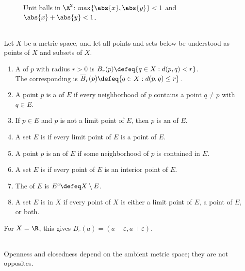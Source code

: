 \begin{figure}[htbp]
  \centering
  
  \caption{Unit balls in $\R^2$: \textcolor{blue!60!black}{$\max\{\abs{x},\abs{y}\}<1$} and \textcolor{orange!80!black}{$\abs{x}+\abs{y}<1$}.}
  \label{fig:product-metric-unit-balls}
\end{figure}

\begin{definition} \label{def:metric-topology-core-definitions}\label{def:metric-topology-core-definitions-source-todo} \\
Let $X$ be a metric space, and let all points and sets below be understood as points of $X$ and subsets of $X$.
\begin{enumerate}[label=(\roman*)]
\setlength{\itemsep}{0pt}
\item A  of $p$ with radius $r>0$ is $B_r(p)\defeq\{q\in X:d(p,q)<r\}$.\\
The corresponding  is $\overline{B}_r(p)\defeq\{q\in X:d(p,q)\leq r\}$.
\item A point $p$ is a  of $E$ if every neighborhood of $p$ contains a point $q\neq p$ with $q\in E$.
\item If $p\in E$ and $p$ is not a limit point of $E$, then $p$ is an  of $E$.
\item A set $E$ is  if every limit point of $E$ is a point of $E$.
\item A point $p$ is an  of $E$ if some neighborhood of $p$ is contained in $E$.
\item A set $E$ is  if every point of $E$ is an interior point of $E$.
\item The  of $E$ is $E^c\defeq X\setminus E$.
\item A set $E$ is  in $X$ if every point of $X$ is either a limit point of $E$, a point of $E$, or both.
\end{enumerate}
For $X=\R$, this gives $B_\varepsilon(a)=(a-\varepsilon,a+\varepsilon)$.\\
\end{definition}

\begin{remark} \label{rem:open-closed-ambient-and-not-opposites} \\
Openness and closedness depend on the ambient metric space; they are not opposites.
\end{remark}


